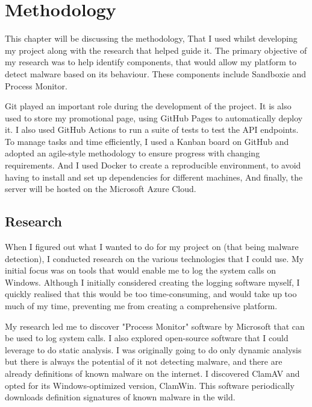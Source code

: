 \chapter{Methodology}

This chapter will be discussing the methodology,
That I used whilst developing my project
along with the research that helped guide it.
The primary objective of my research was to help identify components,
that would allow my platform to detect malware based on its behaviour.
These components include Sandboxie and Process Monitor.

Git played an important role during the development of the project.
It is also used to store my promotional page,
using GitHub Pages to automatically deploy it.
I also used GitHub Actions to run a suite of tests to test the API endpoints.
To manage tasks and time efficiently, I used a Kanban board on GitHub
and adopted an agile-style methodology to ensure
progress with changing requirements.
And I used Docker to create a reproducible environment,
to avoid having to install and set up dependencies for different machines,
And finally, the server will be hosted on the Microsoft Azure Cloud.

\section{Research}
When I figured out what I wanted to do for my project
on (that being malware detection),
I conducted research on the various technologies that I could use.
My initial focus was on tools that would enable me
to log the system calls on Windows.
Although I initially considered creating the logging software myself,
I quickly realised that this would be too time-consuming,
and would take up too much of my time,
preventing me from creating a comprehensive platform.

My research led me to discover "Process Monitor" \cite{procmon}
software by Microsoft that can be used to log system calls.
I also explored open-source software that
I could leverage to do static analysis.
I was originally going to do only dynamic analysis
but there is always the potential of it not detecting malware,
and there are already definitions of known malware on the internet.
I discovered ClamAV and opted for its Windows-optimized version, ClamWin.
This software periodically downloads definition signatures
of known malware in the wild.

